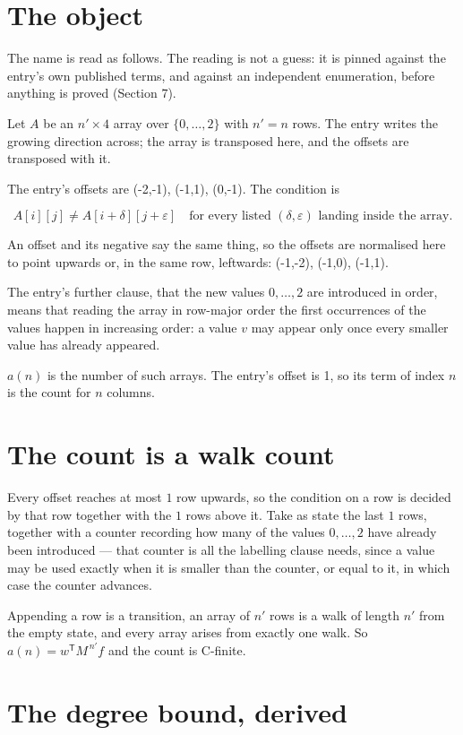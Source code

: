 \documentclass[11pt]{article}
\theoremstyle{definition}
\begin{document}
\section{The object}

The name is read as follows. The reading is not a guess: it is pinned against the entry's own published terms, and against an independent enumeration, before anything is proved (Section 7).

Let $A$ be an $n' \times 4$ array over $\{0,\dots,2\}$ with $n' = n$ rows. The entry writes the growing direction across; the array is transposed here, and the offsets are transposed with it.

The entry's offsets are (-2,-1), (-1,1), (0,-1). The condition is

\[A[i][j] \ne A[i{+}\delta][j{+}\varepsilon]\quad\text{for every listed }(\delta,\varepsilon)\text{ landing inside the array.}\]

An offset and its negative say the same thing, so the offsets are normalised here to point upwards or, in the same row, leftwards: (-1,-2), (-1,0), (-1,1).

The entry's further clause, that the new values $0,\dots,2$ are introduced in order, means that reading the array in row-major order the first occurrences of the values happen in increasing order: a value $v$ may appear only once every smaller value has already appeared.

$a(n)$ is the number of such arrays. The entry's offset is 1, so its term of index $n$ is the count for $n$ columns.

\section{The count is a walk count}

Every offset reaches at most $1$ row upwards, so the condition on a row is decided by that row together with the $1$ rows above it. Take as state the last $1$ rows, together with a counter recording how many of the values $0,\dots,2$ have already been introduced --- that counter is all the labelling clause needs, since a value may be used exactly when it is smaller than the counter, or equal to it, in which case the counter advances.

Appending a row is a transition, an array of $n'$ rows is a walk of length $n'$ from the empty state, and every array arises from exactly one walk. So $a(n) = w^{\mathsf T}M^{\,n'}f$ and the count is C-finite.

\section{The degree bound, derived}
\end{document}
